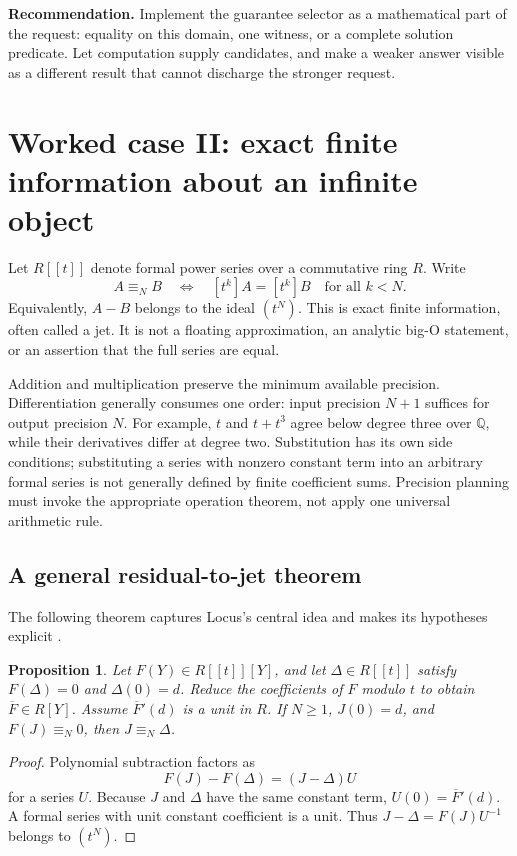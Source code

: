 \documentclass[11pt,letterpaper]{article}
\newcommand{\Q}{\mathbb Q}
\newcommand{\decision}[1]{\par\smallskip\textbf{Recommendation.} #1\par\smallskip}
\newtheorem{proposition}{Proposition}
\begin{document}
\decision{Implement the guarantee selector as a mathematical part of the
request: equality on this domain, one witness, or a complete solution
predicate. Let computation supply candidates, and make a weaker answer visible
as a different result that cannot discharge the stronger request.}

\section{Worked case II: exact finite information about an infinite object}\label{sec:jets}
Let \(R[[t]]\) denote formal power series over a commutative ring \(R\). Write
\[
 A\equiv_N B\quad\Longleftrightarrow\quad
       [t^k]A=[t^k]B\quad\text{for all }k<N.
\]
Equivalently, \(A-B\) belongs to the ideal \((t^N)\). This is exact finite
information, often called a jet. It is not a floating approximation, an analytic
big-O statement, or an assertion that the full series are equal.

Addition and multiplication preserve the minimum available precision.
Differentiation generally consumes one order: input precision \(N+1\) suffices
for output precision \(N\). For example, \(t\) and \(t+t^3\) agree below
degree three over \(\Q\), while their derivatives differ at degree two.
Substitution has its own side conditions; substituting a series with nonzero
constant term into an arbitrary formal series is not generally defined by
finite coefficient sums. Precision planning must invoke the appropriate
operation theorem, not apply one universal arithmetic rule.

\subsection{A general residual-to-jet theorem}
The following theorem captures Locus's central idea and makes its hypotheses
explicit \cite[formal-root development]{locus}.

\begin{proposition}\label{prop:residual}
Let \(F(Y)\in R[[t]][Y]\), and let \(\Delta\in R[[t]]\) satisfy
\(F(\Delta)=0\) and \(\Delta(0)=d\). Reduce the coefficients of \(F\) modulo
\(t\) to obtain \(\overline F\in R[Y]\). Assume
\(\overline F'(d)\) is a unit in \(R\). If \(N\ge1\), \(J(0)=d\), and
\(F(J)\equiv_N0\), then \(J\equiv_N\Delta\).
\end{proposition}
\begin{proof}
Polynomial subtraction factors as
\[
 F(J)-F(\Delta)=(J-\Delta)U
\]
for a series \(U\). Because \(J\) and \(\Delta\) have the same constant term,
\(U(0)=\overline F'(d)\). A formal series with unit constant coefficient is a
unit. Thus \(J-\Delta=F(J)U^{-1}\) belongs to \((t^N)\).
\end{proof}
\end{document}
